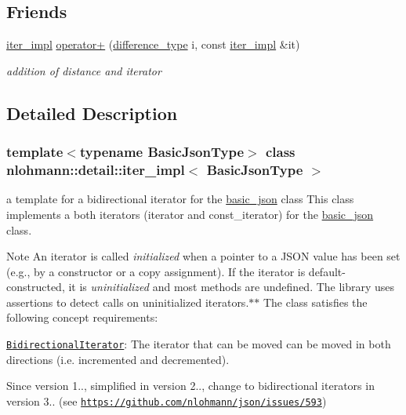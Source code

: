 \subsection*{Friends}
\begin{DoxyCompactItemize}
\item 
\mbox{\hyperlink{classnlohmann_1_1detail_1_1iter__impl}{iter\+\_\+impl}} \mbox{\hyperlink{classnlohmann_1_1detail_1_1iter__impl_a94108d1a7563e103534f23eb5c1ee175}{operator+}} (\mbox{\hyperlink{classnlohmann_1_1detail_1_1iter__impl_a2f7ea9f7022850809c60fc3263775840}{difference\+\_\+type}} i, const \mbox{\hyperlink{classnlohmann_1_1detail_1_1iter__impl}{iter\+\_\+impl}} \&it)
\begin{DoxyCompactList}\small\item\em addition of distance and iterator \end{DoxyCompactList}\end{DoxyCompactItemize}


\subsection{Detailed Description}
\subsubsection*{template$<$typename Basic\+Json\+Type$>$\newline
class nlohmann\+::detail\+::iter\+\_\+impl$<$ Basic\+Json\+Type $>$}

a template for a bidirectional iterator for the \mbox{\hyperlink{classnlohmann_1_1basic__json}{basic\+\_\+json}} class This class implements a both iterators (iterator and const\+\_\+iterator) for the \mbox{\hyperlink{classnlohmann_1_1basic__json}{basic\+\_\+json}} class. 

\begin{DoxyNote}{Note}
An iterator is called {\itshape initialized} when a pointer to a J\+S\+ON value has been set (e.\+g., by a constructor or a copy assignment). If the iterator is default-\/constructed, it is {\itshape uninitialized} and most methods are undefined. The library uses assertions to detect calls on uninitialized iterators.$\ast$$\ast$  The class satisfies the following concept requirements\+:
\begin{DoxyItemize}
\item \href{https://en.cppreference.com/w/cpp/named_req/BidirectionalIterator}{\tt Bidirectional\+Iterator}\+: The iterator that can be moved can be moved in both directions (i.\+e. incremented and decremented). 
\end{DoxyItemize}
\end{DoxyNote}
\begin{DoxySince}{Since}
version 1.., simplified in version 2.., change to bidirectional iterators in version 3.. (see \href{https://github.com/nlohmann/json/issues/593}{\tt https\+://github.\+com/nlohmann/json/issues/593}) 
\end{DoxySince}


